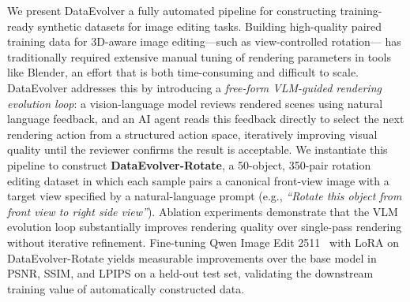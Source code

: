 We present DataEvolver a fully automated pipeline for constructing training-ready synthetic datasets for image editing tasks.
Building high-quality paired training data for 3D-aware image editing---such as view-controlled rotation---
has traditionally required extensive manual tuning of rendering parameters in tools like Blender,
an effort that is both time-consuming and difficult to scale.
DataEvolver addresses this by introducing a \emph{free-form VLM-guided rendering evolution loop}:
a vision-language model reviews rendered scenes using natural language feedback,
and an AI agent reads this feedback directly to select the next rendering action
from a structured action space, iteratively improving visual quality
until the reviewer confirms the result is acceptable.
We instantiate this pipeline to construct \textbf{DataEvolver-Rotate},
a 50-object, 350-pair rotation editing dataset in which each sample pairs
a canonical front-view image with a target view specified by a natural-language prompt
(e.g., \textit{``Rotate this object from front view to right side view''}).
Ablation experiments demonstrate that the VLM evolution loop substantially improves
rendering quality over single-pass rendering without iterative refinement.
Fine-tuning Qwen Image Edit 2511~\cite{PLACEHOLDER_qwen_image_edit_verify} with LoRA on DataEvolver-Rotate
yields measurable improvements over the base model in PSNR, SSIM, and LPIPS on a held-out test set,
validating the downstream training value of automatically constructed data.

